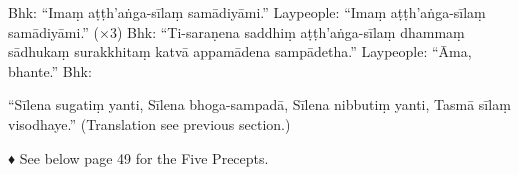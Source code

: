 Bhk: “Imaṃ aṭṭh’aṅga-sīlaṃ samādiyāmi.”
Laypeople: “Imaṃ aṭṭh’aṅga-sīlaṃ
samādiyāmi.” (×3)
Bhk: “Ti-saraṇena saddhiṃ aṭṭh’aṅga-sīlaṃ
dhammaṃ sādhukaṃ surakkhitaṃ katvā
appamādena sampādetha.”
Laypeople: “Āma, bhante.”
Bhk:

“Sīlena sugatiṃ yanti,
Sīlena bhoga-sampadā,
Sīlena nibbutiṃ yanti,
Tasmā sīlaṃ visodhaye.”
(Translation see previous section.)

♦ See below page 49 for the Five Precepts.

